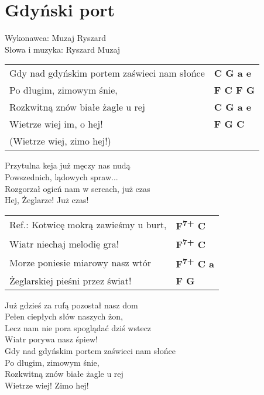 \section{Gdyński port}

Wykonawca: Muzaj Ryszard\\
Słowa i muzyka: Ryszard Muzaj

\vspace{2em}
\begin{tabular}{@{}p{9cm}@{}l@{}}
Gdy nad gdyńskim portem zaświeci nam słońce  & \bfseries C G a e\\
Po długim, zimowym śnie, & \bfseries  F C F G\\
Rozkwitną znów białe żagle u rej & \bfseries  C G a e\\
Wietrze wiej im, o hej! & \bfseries  F G C\\
(Wietrze wiej, zimo hej!)
\end{tabular}

\vspace{1em}
Przytulna keja już męczy nas nudą \\
Powszednich, lądowych spraw... \\
Rozgorzał ogień nam w sercach, już czas \\
Hej, Żeglarze! Już czas! \\

\vspace{1em}
\begin{tabular}{@{}p{9cm}@{}l@{}}
Ref.: Kotwicę mokrą zawieśmy u burt, & \bfseries  F\textsuperscript{7+} C \\
Wiatr niechaj melodię gra! & \bfseries  F\textsuperscript{7+} C \\
Morze poniesie miarowy nasz wtór & \bfseries  F\textsuperscript{7+} C a \\
Żeglarskiej pieśni przez świat! & \bfseries  F G \\
\end{tabular}

\vspace{1em}
Już gdzieś za rufą pozostał nasz dom \\
Pełen ciepłych słów naszych żon, \\
Lecz nam nie pora spoglądać dziś wstecz  \\
Wiatr porywa nasz śpiew! \\

Gdy nad gdyńskim portem zaświeci nam słońce \\
Po długim, zimowym śnie, \\
Rozkwitną znów białe żagle u rej  \\
Wietrze wiej! Zimo hej!
